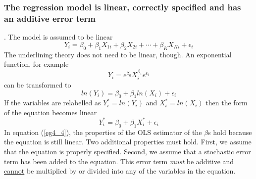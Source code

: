 \documentclass[11pt]{article}
\begin{document}
\subsubsection{The regression model is linear, correctly specified and has an additive error term}. The model is assumed to be linear
\begin{equation}
Y_i = \beta_0 + \beta_1X_{1i}+\beta_2X_{2i}+ \cdots + \beta_KX_{Ki} + \epsilon_i \label{eg4_1}
\end{equation}
The underlining theory does not need to be linear, though. An exponential function, for example
\begin{equation}
Y_i = e^{\beta_0}X_i^{\beta_1}e^{\epsilon_i} \label{eg4_2}
\end{equation}
can be transformed to 
\begin{equation}
ln(Y_i) = \beta_0 + \beta_1ln(X_i) + \epsilon_i \label{eg4_3}
\end{equation}
If the variables are relabelled as $Y_i^* = ln(Y_i)$ and $X_i^*= ln(X_i)$ then the form of the equation becomes linear
\begin{equation}
Y_i^* = \beta_0 + \beta_1 X_i^* + \epsilon_i \label{eg4_4}
\end{equation}
In equation (\ref{eg4_4}), the properties of the OLS estimator of the $\beta$s hold because the equation is still linear. Two additional properties must hold. First, we assume that the equation is properly specified. Second, we assume that a stochastic error term has been added to the equation. This error term \textit{must} be additive and \underline{cannot} be multiplied by or divided into any of the variables in the equation.
\end{document}

